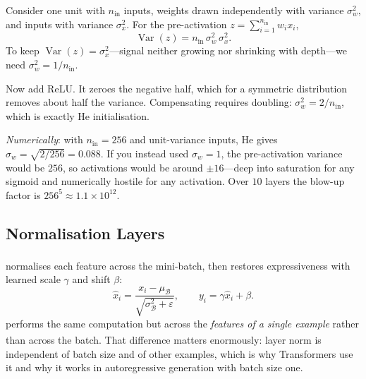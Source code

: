 \begin{workedexample}
Consider one unit with $n_{\text{in}}$ inputs, weights drawn independently with
variance $\sigma_w^2$, and inputs with variance $\sigma_x^2$. For the
pre-activation $z=\sum_{i=1}^{n_{\text{in}}} w_ix_i$,
\[
  \operatorname{Var}(z) = n_{\text{in}}\,\sigma_w^2\,\sigma_x^2 .
\]
To keep $\operatorname{Var}(z) = \sigma_x^2$---signal neither growing nor
shrinking with depth---we need $\sigma_w^2 = 1/n_{\text{in}}$.

Now add ReLU. It zeroes the negative half, which for a symmetric distribution
removes about half the variance. Compensating requires doubling:
$\sigma_w^2 = 2/n_{\text{in}}$, which is exactly He initialisation.

\emph{Numerically}: with $n_{\text{in}}=256$ and unit-variance inputs, He gives
$\sigma_w = \sqrt{2/256} = 0.088$. If you instead used $\sigma_w = 1$, the
pre-activation variance would be $256$, so activations would be around
$\pm16$---deep into saturation for any sigmoid and numerically hostile for any
activation. Over $10$ layers the blow-up factor is $256^{5} \approx
1.1\times10^{12}$.
\end{workedexample}

\subsection{Normalisation Layers}

 normalises each feature across the
mini-batch\textsuperscript{\cite{ioffeBatchNormalizationAccelerating2015}}, then
restores expressiveness with learned scale $\gamma$ and shift $\beta$:
\begin{equation}
  \hat x_i = \frac{x_i-\mu_{\mathcal{B}}}
                  {\sqrt{\sigma^2_{\mathcal{B}}+\varepsilon}},
  \qquad
  y_i = \gamma\hat x_i + \beta .
  \label{eq:dl-batchnorm}
\end{equation}
 performs the same computation but across the
\emph{features of a single example} rather than across the
batch\textsuperscript{\cite{baLayerNormalization2016}}. That difference matters
enormously: layer norm is independent of batch size and of other examples, which
is why Transformers use it and why it works in autoregressive generation with
batch size one.

